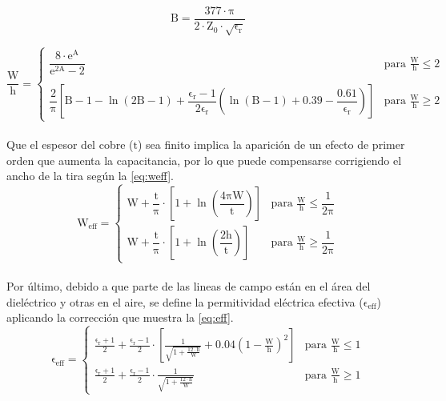 \documentclass{article}
\begin{document}
\begin{equation}
    \mathrm{B = \frac{377 \cdot \pi}{2 \cdot Z_{0} \cdot \sqrt{\epsilon_{r}}}}
    \label{eq:B}
\end{equation}

\begin{equation}
    \mathrm{\frac{W}{h} =} 
    \begin{cases} 
        \mathrm{\dfrac{8  \cdot e^{A}}{e^{2A} - 2}} & \text{para } \mathrm{\frac{W}{h} \leq 2} \\ 
        \\
        \mathrm{\dfrac{2}{\pi} \left[ B - 1 - \ln(2B - 1) + \dfrac{\epsilon_{r} - 1}{2\epsilon_{r}} \left( \ln(B - 1) + 0.39 - \dfrac{0.61}{\epsilon_{r}} \right) \right]} & \text{para } \mathrm{\frac{W}{h} \geq 2} 
    \end{cases}
    \label{eq:W_H}
\end{equation} \\

Que el espesor del cobre ($\mathrm{t}$) sea finito implica la aparición de un efecto de primer orden que aumenta la capacitancia, por lo que puede compensarse corrigiendo el ancho de la tira según la \autoref{eq:weff}.
\begin{equation}
    \mathrm{W_{eff} = }
    \begin{cases} 
        \mathrm{W + \dfrac{t}{\pi} \cdot \left[ 1 + \ln\left( \dfrac{4\pi W}{t} \right) \right]} & \text{para } \mathrm{\frac{W}{h} \leq \dfrac{1}{2\pi}} \\ 
        \mathrm{W + \dfrac{t}{\pi} \cdot \left[ 1 + \ln\left( \dfrac{2h}{t} \right) \right]} & \text{para } \mathrm{\frac{W}{h} \geq \dfrac{1}{2\pi}}
    \end{cases}
    \label{eq:weff}
\end{equation} \\

Por último, debido a que parte de las lineas de campo están en el área del dieléctrico y otras en el aire, se define la permitividad eléctrica efectiva ($\mathrm{\epsilon_{eff}}$) aplicando la corrección que muestra la \autoref{eq:eff}.
\begin{equation}
    \mathrm{\epsilon_{eff} =}
    \begin{cases} 
        \mathrm{\frac{\epsilon_{r} + 1}{2} + \frac{\epsilon_{r} - 1}{2} \cdot \left[ \frac{1}{\sqrt{1 + \frac{12 \cdot h}{W}}} +0.04 \left( 1 - \frac{W}{h}\right)^2\right]} & \text{para } \mathrm{\frac{W}{h} \leq 1} \\ 
        \mathrm{\frac{\epsilon_{r} + 1}{2} + \frac{\epsilon_{r} - 1}{2} \cdot \frac{1}{\sqrt{1 + \frac{12 \cdot h}{W}}} } & \text{para } \mathrm{\frac{W}{h} \geq 1}
    \end{cases}
    \label{eq:eff}
\end{equation} \\
\end{document}
